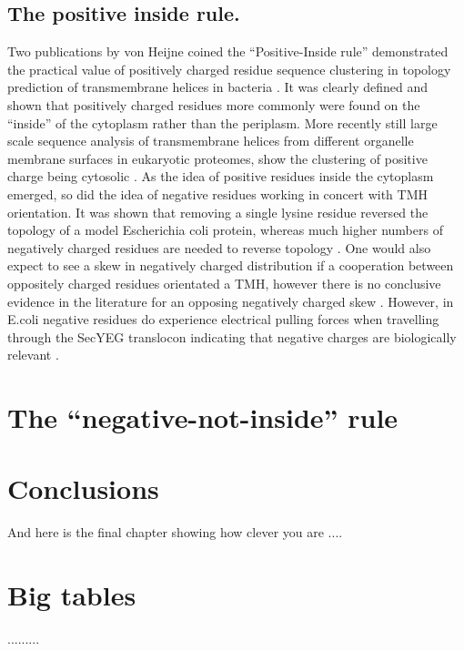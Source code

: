\documentclass[12pt,PhD,twoside]{muthesis}
\begin{document}
\section{The positive inside rule.}
Two publications by von Heijne coined the ``Positive-Inside rule'' demonstrated the practical value of positively charged residue sequence clustering in topology prediction of transmembrane helices in bacteria \cite{VonHeijne1989,VonHeijne1992}. It was clearly defined and shown that positively charged residues more commonly were found on the ``inside'' of the cytoplasm rather than the periplasm. More recently still large scale sequence analysis of transmembrane helices from different organelle membrane surfaces in eukaryotic proteomes, show the clustering of positive charge being cytosolic \cite{Sharpe2010, Baeza-Delgado2013}.
As the idea of positive residues inside the cytoplasm emerged, so did the idea of negative residues working in concert with TMH orientation. It was shown that removing a single lysine residue reversed the topology of a model Escherichia coli protein, whereas much higher numbers of negatively charged residues are needed to reverse topology \cite{Nilsson1990}. One would also expect to see a skew in negatively charged distribution if a cooperation between oppositely charged residues orientated a TMH, however there is no conclusive evidence in the literature for an opposing negatively charged skew \cite{Granseth2005, Nilsson2005, Sharpe2010, Baeza-Delgado2013}. However, in E.coli negative residues do experience electrical pulling forces when travelling through the SecYEG translocon indicating that negative charges are biologically relevant \cite{Ismail2015}.


\chapter{The ``negative-not-inside'' rule}


\chapter{Conclusions}
And here is the final chapter showing how clever you are ....


\printbibliography[title={Bibliography}]

\appendix
\chapter{Big tables}
.........
\end{document}
